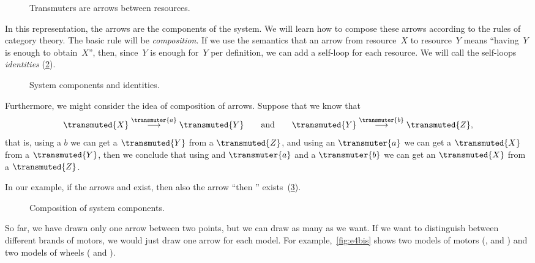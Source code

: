 
\begin{figure}[h!]
    \centering
    \caption{Transmuters are arrows between resources. \label{fig:e2}}
\end{figure}

In this representation, the arrows are the components of the system.
We will learn how to compose these arrows according to the rules of category theory.
The basic rule will be \emph{composition}.
If we use the semantics that an arrow from resource~$X$ to resource~$Y$ means ``having~$Y$ is
enough to obtain~$X$'', then, since~$Y$ is enough for~$Y$ per definition, we can add a self-loop for each
resource. We will call the self-loops \emph{identities} (\cref{fig:e3}).

\begin{figure}[h!]
    \centering
    \caption{System components and identities. \label{fig:e3}}
\end{figure}

Furthermore, we might consider the idea of composition of arrows.
Suppose that we know that
\begin{equation*}
    \transmuted{X} \stackrel{\transmuter{a}}{\longrightarrow} \transmuted{Y}
    \qquad \text{and} \qquad
    \transmuted{Y} \stackrel{\transmuter{b}}{\longrightarrow} \transmuted{Z},
\end{equation*}
that is, using a $b$ we can get a $\transmuted{Y}$ from a $\transmuted{Z}$, and using an $\transmuter{a}$ we can get a $\transmuted{X}$ from a $\transmuted{Y}$,
then we conclude that using and $\transmuter{a}$ and a $\transmuter{b}$ we can get an $\transmuted{X}$ from a $\transmuted{Z}$.

In our example, if the arrows \wheels  and \motor exist, then also the arrow ``\wheels then \motor'' exists~(\cref{fig:e4}).

\begin{figure}[h!]
    \centering
    \caption{Composition of system components. \label{fig:e4}}
\end{figure}

So far, we have drawn only one arrow between two points, but we can draw as many as we want.
If we want to distinguish between different brands of motors, we would just draw
one arrow for each model. For example,~\cref{fig:e4bis} shows two models of
motors (, and ) and two models of wheels
( and ).


